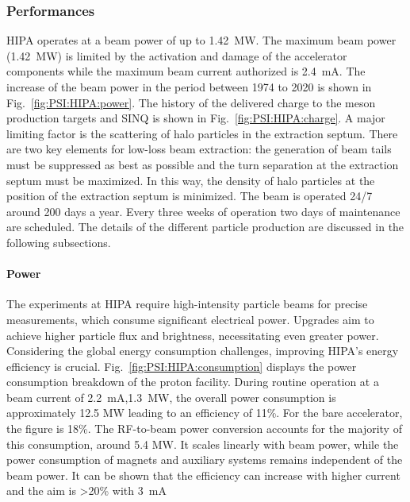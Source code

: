 \begin{refsection}
        \subsubsection{Performances}
        HIPA operates at a beam power of up to \SI{1.42}{MW}. 
        The maximum beam power (\SI{1.42}{MW}) is limited by the activation and damage of the accelerator components while the maximum beam current authorized is \SI{2.4}{mA}.
        The increase of the beam power in the period between 1974 to 2020 is shown in Fig.~\ref{fig:PSI:HIPA:power}.
        The history of the delivered charge to the meson production targets and SINQ is shown in Fig.~\ref{fig:PSI:HIPA:charge}.  
        A major limiting factor is the scattering of halo particles in the extraction septum.
        There are two key elements for low-loss beam extraction: the generation of beam tails must
        be suppressed as best as possible and the turn separation at the extraction septum must be
        maximized. 
        In this way, the density of halo particles at the position of the extraction septum is minimized.
        The beam is operated 24/7 around 200 days a year. 
        Every three weeks of operation two days of maintenance are scheduled. 
        The details of the different particle production are discussed in the following subsections.

        \paragraph{Power} The experiments at HIPA require high-intensity particle beams for precise measurements, which consume significant electrical power. 
        Upgrades aim to achieve higher particle flux and brightness, necessitating even greater power. 
        Considering the global energy consumption challenges, improving HIPA's energy efficiency is crucial. 
        Fig.~\ref{fig:PSI:HIPA:consumption} displays the power consumption breakdown of the proton facility. 
        During routine operation at a beam current of \SI{2.2}{mA},\SI{1.3}{MW}, the overall power consumption is approximately 12.5 MW leading to an efficiency of 11\%.
        For the bare accelerator, the figure is 18\%.
        The RF-to-beam power conversion accounts for the majority of this consumption, around 5.4 MW. 
        It scales linearly with beam power, while the power consumption of magnets and auxiliary systems remains independent of the beam power.
        It can be shown that the efficiency can increase with higher current and the aim is >20\% with \SI{3}{mA}
        

\end{refsection}
